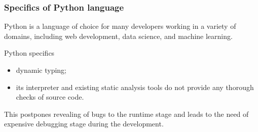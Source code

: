 \documentclass{beamer}
\begin{document}








\begin{frame}
\frametitle{Specifics of Python language}

Python is a language of choice for many developers working 
in a variety of domains, including 
web development, data science, and machine learning.

\begin{block}{Python specifics}
\begin{itemize}
\item dynamic typing;
\item its interpreter and existing static analysis tools do not
provide any thorough checks of source code.
\end{itemize}

This
postpones revealing of bugs to the runtime stage 
and leads to the need of expensive debugging stage 
during the development. 
\end{block}


\end{frame}
\end{document}
